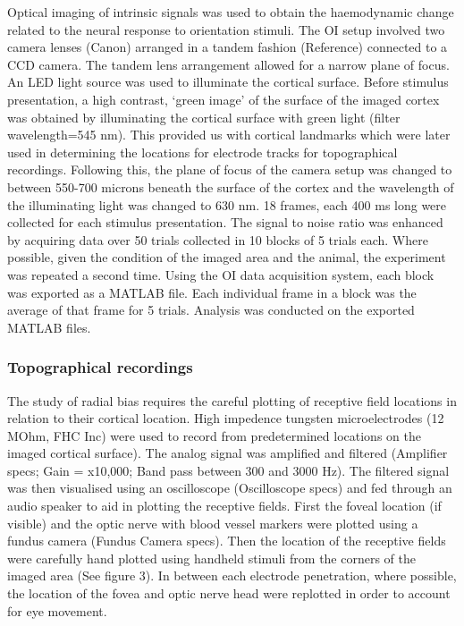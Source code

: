 			Optical imaging of intrinsic signals was used to obtain the haemodynamic change related to the neural response to orientation stimuli. The OI setup involved two camera lenses (Canon) arranged in a tandem fashion (Reference) connected to a CCD camera. The tandem lens arrangement allowed for a narrow plane of focus. An LED light source was used to illuminate the cortical surface. Before stimulus presentation, a high contrast, ‘green image’ of the surface of the imaged cortex was obtained by illuminating the cortical surface with green light (filter wavelength=545 nm). This provided us with cortical landmarks which were later used in determining the locations for electrode tracks for topographical recordings. Following this, the plane of focus of the camera setup was changed to between 550-700 microns beneath the surface of the cortex and the wavelength of the illuminating light was changed to 630 nm. 18 frames, each 400 ms long were collected for each stimulus presentation. The signal to noise ratio was enhanced by acquiring data over 50 trials collected in 10 blocks of 5 trials each. Where possible, given the condition of the imaged area and the animal, the experiment was repeated a second time. Using the OI data acquisition system, each block was exported as a MATLAB file. Each individual frame in a block was the average of that frame for 5 trials. Analysis was conducted on the exported MATLAB files.
		
			
		\subsubsection{Topographical recordings}
	
			The study of radial bias requires the careful plotting of receptive field locations in relation to their cortical location. High impedence tungsten microelectrodes (12 MOhm, FHC Inc) were used to record from predetermined locations on the imaged cortical surface). The analog signal was amplified and filtered (Amplifier specs; Gain = x10,000; Band pass between 300 and 3000 Hz). The filtered signal was then visualised using an oscilloscope (Oscilloscope specs) and fed through an audio speaker to aid in plotting the receptive fields. First the foveal location (if visible) and the optic nerve with blood vessel markers were plotted using a fundus camera (Fundus Camera specs). Then the location of the receptive fields were carefully hand plotted using handheld stimuli from the corners of the imaged area (See figure 3). In between each electrode penetration, where possible, the location of the fovea and optic nerve head were replotted in order to account for eye movement.
			
